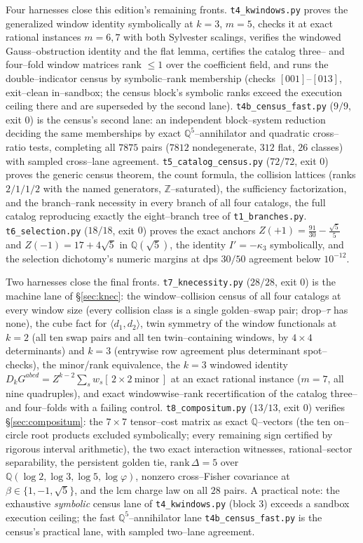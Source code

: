 \documentclass[11pt]{article}
\theoremstyle{definition}
\newcommand{\ph}{\varphi}
\newcommand{\Q}{\mathbb{Q}}
\newcommand{\Z}{\mathbb{Z}}
\begin{document}
Four harnesses close this edition's remaining fronts. \texttt{t4\_kwindows.py} proves the
generalized window identity symbolically at $k=3$, $m=5$, checks it at exact rational instances
$m=6,7$ with both Sylvester scalings, verifies the windowed Gauss--obstruction identity and the flat
lemma, certifies the catalog three-- and four--fold window matrices rank $\le1$ over the coefficient
field, and runs the double--indicator census by symbolic--rank membership (checks
$[001]$--$[013]$, exit--clean in--sandbox; the census block's symbolic ranks exceed the execution
ceiling there and are superseded by the second lane).
\texttt{t4b\_census\_fast.py} ($9/9$, exit $0$) is the census's second lane: an independent
block--system reduction deciding the same memberships by exact $\Q^5$--annihilator and quadratic
cross--ratio tests, completing all $7875$ pairs ($7812$ nondegenerate, $312$ flat, $26$ classes)
with sampled cross--lane agreement. \texttt{t5\_catalog\_census.py} ($72/72$, exit $0$) proves the
generic census theorem, the count formula, the collision lattices (ranks $2/1/1/2$ with the named
generators, $\Z$--saturated), the sufficiency factorization, and the branch--rank necessity in every
branch of all four catalogs, the full catalog reproducing exactly the eight--branch tree of
\texttt{t1\_branches.py}. \texttt{t6\_selection.py} ($18/18$, exit $0$) proves the exact anchors
$Z(+1)=\tfrac{91}{30}-\tfrac{\sqrt5}5$ and $Z(-1)=17+4\sqrt5$ in $\Q(\sqrt5)$, the identity
$I'=-\kappa_3$ symbolically, and the selection dichotomy's numeric margins at dps $30/50$
agreement below $10^{-12}$.

Two harnesses close the final fronts. \texttt{t7\_knecessity.py} ($28/28$, exit $0$) is
the machine lane of \S\ref{sec:knec}: the window--collision census of all four catalogs at every
window size (every collision class is a single golden--swap pair; drop--$\tau$ has none), the
cube fact for $\langle d_1,d_2\rangle$, twin symmetry of the window functionals at $k=2$ (all ten
swap pairs and all ten twin--containing windows, by $4\times4$ determinants) and $k=3$ (entrywise
row agreement plus determinant spot--checks), the minor/rank equivalence, the $k=3$ windowed
identity $D_kG^{abcd}=Z^{k-2}\sum_sw_s[\,2\times2\ \text{minor}\,]$ at an exact rational instance
($m=7$, all nine quadruples), and exact windowwise--rank recertification of the catalog three--
and four--folds with a failing control. \texttt{t8\_compositum.py} ($13/13$, exit $0$) verifies
\S\ref{sec:compositum}: the $7\times7$ tensor--cost matrix as exact $\Q$--vectors (the ten
on--circle root products excluded symbolically; every remaining sign certified by rigorous
interval arithmetic), the two exact interaction witnesses, rational--sector separability, the
persistent golden tie, $\mathrm{rank}\,\Delta=5$ over $\Q(\log2,\log3,\log5,\log\ph)$, nonzero
cross--Fisher covariance at $\beta\in\{1,-1,\sqrt5\}$, and the $\mathrm{lcm}$ charge law on all
$28$ pairs. A practical note: the exhaustive \emph{symbolic} census lane of
\texttt{t4\_kwindows.py} (block 3) exceeds a sandbox execution ceiling; the fast
$\Q^5$--annihilator lane \texttt{t4b\_census\_fast.py} is the census's practical lane, with
sampled two--lane agreement.
\end{document}

